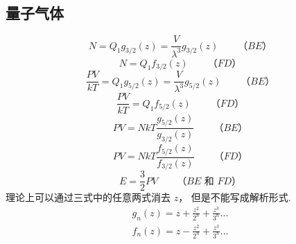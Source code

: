 \subsection{量子气体}
\begin{equation}
  N = {Q_1}{g_{3/2}}\left( z \right) = \frac{V}{{{\lambda ^3}}}{g_{3/2}}\left( z \right)
  \qquad
  \text{（$BE$）}
\end{equation}
\begin{equation}
  N = {Q_1}{f_{3/2}}\left( z \right)
  \qquad
  \text{（$FD$）}
\end{equation}
\begin{equation}
  \frac{{PV}}{{kT}} = {Q_1}{g_{5/2}}\left( z \right) = \frac{V}{{{\lambda ^3}}}{g_{5/2}}\left( z \right)
  \qquad
  \text{（$BE$）}
\end{equation}
\begin{equation}
  \frac{{PV}}{{kT}} = {Q_1}{f_{5/2}}\left( z \right)
  \qquad
  \text{（$FD$）}
\end{equation}
\begin{equation}
  PV = NkT\frac{{{g_{5/2}}(z)}}{{{g_{3/2}}(z)}}
  \qquad
  \text{（$BE$）}
\end{equation}
\begin{equation}
  PV = NkT\frac{{{f_{5/2}}(z)}}{{{f_{3/2}}(z)}}
  \qquad
  \text{（$FD$）}
\end{equation}
\begin{equation}
  E = \frac{3}{2}PV
  \qquad
  \text{（$BE$ 和 $FD$）}
\end{equation}
理论上可以通过三式中的任意两式消去 $z$，  但是不能写成解析形式.
\begin{equation}
  \begin{aligned}
{g_n}(z) = z + \frac{{{z^2}}}{{{2^n}}} + \frac{{{z^3}}}{{{3^n}}}...\\
{f_n}(z) = z - \frac{{{z^2}}}{{{2^n}}} + \frac{{{z^3}}}{{{3^n}}}...
\end{aligned}
\end{equation}
